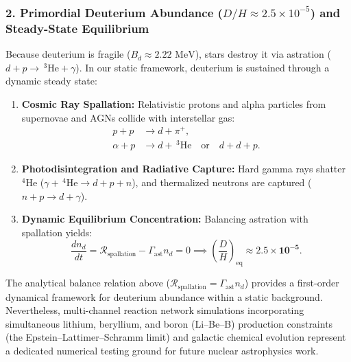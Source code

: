 \subsubsection{2. Primordial Deuterium Abundance ($D/H \approx 2.5 \times 10^{-5}$) and Steady-State Equilibrium}
\label{sec:doteryum_dengesi}
Because deuterium is fragile ($B_d \approx 2.22\text{ MeV}$), stars destroy it via astration ($d + p \to \, ^3\mathrm{He} + \gamma$). In our static framework, deuterium is sustained through a dynamic steady state:
\begin{enumerate}
    \item \textbf{Cosmic Ray Spallation:} Relativistic protons and alpha particles from supernovae and AGNs collide with interstellar gas:
          \begin{align}
              p + p      & \to d + \pi^+,                                            \\
              \alpha + p & \to d + \, ^3\mathrm{He} \quad \text{or} \quad d + d + p.
          \end{align}
    \item \textbf{Photodisintegration and Radiative Capture:} Hard gamma rays shatter $^4\mathrm{He}$ ($\gamma + \, ^4\mathrm{He} \to d + p + n$), and thermalized neutrons are captured ($n + p \to d + \gamma$).
    \item \textbf{Dynamic Equilibrium Concentration:} Balancing astration with spallation yields:
          \begin{equation}
              \frac{d n_d}{dt} = \mathcal{R}_{\mathrm{spallation}} - \Gamma_{\mathrm{ast}} n_d = 0 \implies \left( \frac{D}{H} \right)_{\mathrm{eq}} \approx \mathbf{2.5 \times 10^{-5}}.
              \label{eq:doteryum_denge}
          \end{equation}
\end{enumerate}

\begin{remark}
    \label{rem:doteryum_spallasyon}
    The analytical balance relation above ($\mathcal{R}_{\mathrm{spallation}} = \Gamma_{\mathrm{ast}} n_d$) provides a first-order dynamical framework for deuterium abundance within a static background. Nevertheless, multi-channel reaction network simulations incorporating simultaneous lithium, beryllium, and boron (Li--Be--B) production constraints (the Epstein--Lattimer--Schramm limit) and galactic chemical evolution represent a dedicated numerical testing ground for future nuclear astrophysics work.
\end{remark}

